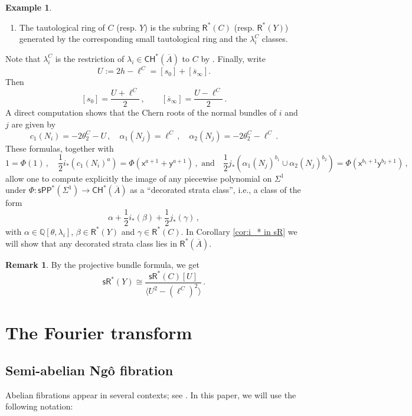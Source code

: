 \documentclass[11pt]{article}
\def\CH{\mathsf{CH}}
\def\R{\mathsf{R}}
\def\sR{\mathsf{sR}}
\newcommand{\barA}{\overline{A}}
\newcommand{\sbar}{\overline{s}}
\newcommand{\sPP}{\mathsf{sPP}}
\newcommand{\spp}{\sPP}
\theoremstyle{definition}
\newtheorem{example}[definition]{Example}
\newtheorem{remark}[definition]{Remark}
\begin{document}
\begin{example}
\begin{enumerate}[label = (\alph*)]
		\item The tautological ring of $C$ (resp. $Y$) is the subring $\R^*(C)$ (resp. $\R^*(Y)$) generated by the corresponding small tautological ring and the $\lambda^C_i$ classes.
	\end{enumerate}
	Note that $\lambda_i^{C}$ is the restriction of $\lambda_i\in \CH^{\ast}(\barA)$ to $C$ by \cite{vdG99}.
	Finally, write
	\[
		U := 2h-\ell^C = [s_0] + [\sbar_\infty].
	\]
	Then
	$$
	[s_0]=\frac{U+\ell^C}{2}\,,\qquad[\sbar_{\infty}]=\frac{U-\ell^C}{2}\,.
	$$
	A direct computation shows that the Chern roots of the normal bundles of $i$ and $j$ are given by
	$$
	c_1(N_i) = -2\theta_2^C -U\,,\quad \alpha_1(N_j) = \ell^C\, ,\quad \alpha_2(N_j)=-2\theta_2^C-\ell^C\, .
	$$
	These formulas, together with
	\begin{equation}\label{eq:normalbunex}
	1 = \Phi(1)\, ,\quad \frac{1}{2}i_*(c_1(N_i)^a) = \Phi (\mathsf{x}^{a+1} + \mathsf{y}^{a+1})\, ,\text{ and}\quad \frac12j_*(\alpha_1(N_j)^{b_1}\cup\alpha_2(N_j)^{b_2}) = \Phi(\mathsf{x}^{b_1+1}\mathsf{y}^{b_2+1})\, ,
	\end{equation}
	allow one to compute explicitly the image of any piecewise polynomial on $\Sigma^{1}$ under $\Phi:\spp^{\ast}(\Sigma^{1})\to \CH^{\ast}(\barA)$
	as a ``decorated strata class'', i.e., a class of the form
	\begin{equation}\label{eq:dec_strata}
		\alpha + \frac{1}{2}i_*(\beta) + \frac{1}{2}j_*(\gamma)\, ,
	\end{equation}
	with $\alpha \in \mathbb Q[\theta, \lambda_i]$, $\beta\in \R^*(Y)$ and $\gamma \in \R^*(C)$.
	In Corollary \ref{cor:i_* in sR} we will show that any decorated strata class lies in $\R^{\ast}(\barA)$.
\end{example}

\begin{remark}
	By the projective bundle formula, we get
	$$
	\sR^*(Y) \cong \frac{\sR^*(C)[U]}{\langle U^2-(\ell^C)^2\rangle}\,.
	$$
\end{remark}

\section{The Fourier transform}\label{sec:Fourier}

\subsection{Semi-abelian Ng\^o fibration}

Abelian fibrations appear in several contexts; see \cite{Ngo,AF,PerverseFourierMSY25}. In this paper, we will
use the following notation:
\end{document}
